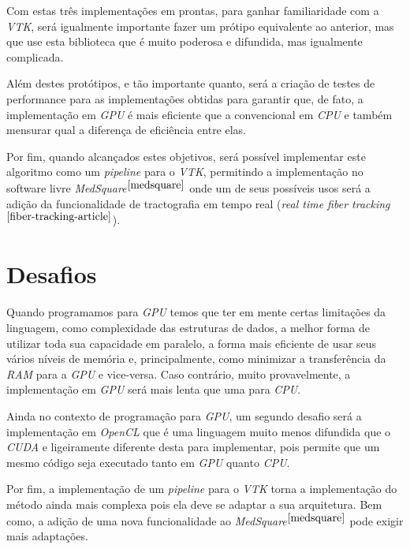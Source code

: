 Com estas três implementações em prontas, para ganhar familiaridade com a \textit{VTK}, será igualmente importante fazer um prótipo equivalente ao anterior, mas que use esta biblioteca que é muito poderosa e difundida, mas igualmente complicada.

Além destes protótipos, e tão importante quanto, será a criação de testes de performance para as implementações obtidas para garantir que, de fato, a implementação em \textit{GPU} é mais eficiente que a convencional em \textit{CPU} e também mensurar qual a diferença de eficiência entre elas.

Por fim, quando alcançados estes objetivos, será possível implementar este algoritmo como um \textit{pipeline} para o \textit{VTK}, permitindo a implementação no software livre \textit{MedSquare}$^{\ref{medsquare}}$ onde um de seus possíveis usos será a adição da funcionalidade de tractografia em tempo real (\textit{real time fiber tracking}$^{\ref{fiber-tracking-article}}$).

\section{Desafios}
Quando programamos para \textit{GPU} temos que ter em mente certas limitações da linguagem, como complexidade das estruturas de dados, a melhor forma de utilizar toda sua capacidade em paralelo, a forma mais eficiente de usar seus vários níveis de memória e, principalmente, como minimizar a transferência da \textit{RAM} para a \textit{GPU} e vice-versa. Caso contrário, muito provavelmente, a implementação em \textit{GPU} será mais lenta que uma para \textit{CPU}.

Ainda no contexto de programação para \textit{GPU}, um segundo desafio será a implementação em \textit{OpenCL} que é uma linguagem muito menos difundida que o \textit{CUDA} e ligeiramente diferente desta para implementar, pois permite que um mesmo código seja executado tanto em \textit{GPU} quanto \textit{CPU}.

Por fim, a implementação de um \textit{pipeline} para o \textit{VTK} torna a implementação do método ainda mais complexa pois ela deve se adaptar a sua arquitetura. Bem como, a adição de uma nova funcionalidade ao \textit{MedSquare}$^{\ref{medsquare}}$ pode exigir mais adaptações.

